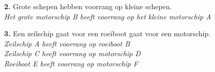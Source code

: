 \begin{figure}[H]
	\centering
	\begin{minipage}[t]{0.70\textwidth}
		\textbf{2.} Grote schepen hebben voorrang op kleine schepen.\\
		\textit{Het grote motorschip B heeft voorrang op het kleine motorschip A}
	\end{minipage}
	\hfill
	\begin{minipage}[t]{0.25\textwidth}
		\label{pic:tg2}
	\end{minipage}
	\hfill
\end{figure}
\vspace{-0.7cm}

\begin{figure}[H]
	\centering
	\begin{minipage}[t]{0.70\textwidth}
		\textbf{3.} Een zeilschip gaat voor een roeiboot gaat voor een motorschip.\\
		\textit{Zeilschip A heeft voorrang op roeiboot B \\
				Zeilschip C heeft voorrang op motorschip D \\
				Roeiboot E heeft voorrang op motorschip F}
	\end{minipage}
	\hfill
	\begin{minipage}[t]{0.25\textwidth}
		\label{pic:tg3a}
	\end{minipage}
	\hfill
\end{figure}
\vspace{-0.7cm}

